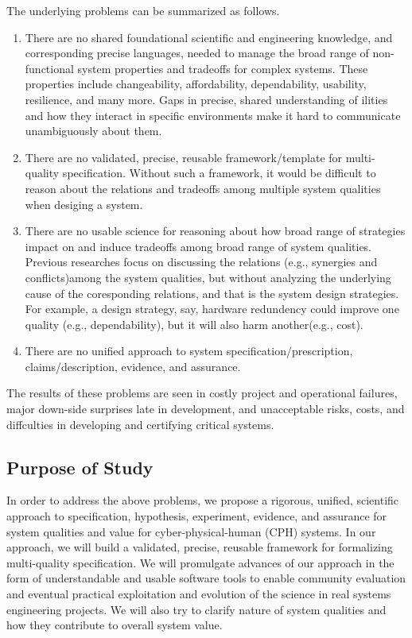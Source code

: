 \documentclass{article} %
\begin{document}
The underlying problems can be summarized as follows.
\begin{enumerate}
  \item
  There are no shared foundational scientific and engineering knowledge, and corresponding precise languages, needed to manage the broad range of non-functional system properties and tradeoffs for complex systems. These properties include changeability, affordability, dependability, usability, resilience, and many more. Gaps in precise, shared understanding of ilities and how they interact in specific environments make it hard to communicate
unambiguously about them.
  \item
  There are no validated, precise, reusable framework/template for multi-quality specification. Without such a framework, it  would be difficult to reason about the relations and tradeoffs among multiple system qualities when desiging a system.
  \item
  There are no usable science for reasoning about how broad range of strategies impact on and induce tradeoffs among broad range of system qualities. Previous researches focus on discussing the relations (e.g., synergies and conflicts)among the system qualities,  but without analyzing the underlying cause of the coresponding relations, and that is the system design strategies. For example, a design strategy, say, hardware redundency could improve one quality (e.g., dependability), but it will also harm another(e.g., cost).
  \item
  There are no unified approach to system specification/prescription, claims/description, evidence, and assurance.

\end{enumerate}
The results of these problems are seen in costly project and operational failures, major down-side surprises late in development, and unacceptable risks, costs, and diffculties in developing and certifying critical systems.
\subsection{Purpose of Study}
In order to address the above problems, we propose a rigorous, unified, scientific approach to specification, hypothesis, experiment, evidence, and assurance for system qualities and value for cyber-physical-human (CPH) systems. In our approach, we will build a validated, precise, reusable framework for formalizing multi-quality specification. We will promulgate advances of our approach in the form of understandable and usable software tools to enable community evaluation and eventual practical exploitation and evolution of the science in real systems engineering projects. We will also try to  clarify nature of system qualities and how they contribute to overall system value.
\end{document}
